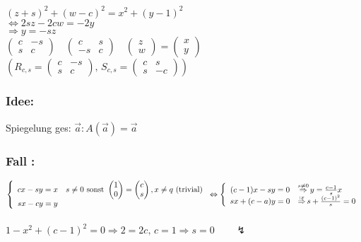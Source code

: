 $(z+s)^{2} + (w-c)^{2} = x^{2}+(y-1)^{2}$\\
$\Leftrightarrow 2sz-2cw = -2y$\\
$\Rightarrow y = -sz$\\
$\begin{pmatrix} c & -s \\ s & c \end{pmatrix} \quad \begin{pmatrix} c & s \\ -s & c \end{pmatrix} \quad \begin{pmatrix} z \\ w \end{pmatrix} = \begin{pmatrix} x \\ y \end{pmatrix}$ \\
$(R_{c,s} = \begin{pmatrix} c & -s \\ s & c \end{pmatrix}, \, S_{c,s} = \begin{pmatrix} c & s \\ s & -c \end{pmatrix})$\\
%
%
%
\subsubsection{Idee:}
Spiegelung ges: $\vec{a}: A(\vec{a})=\vec{a}$
%
%
%
\subsubsection{Fall :} 
$
\left\{
\begin{array}{c l}     
    cx-sy=x  & s \neq 0 \text{ sonst } \begin{pmatrix} 1 \\ 0 \end{pmatrix}= \begin{pmatrix} c \\ s \end{pmatrix}, x \neq q \text{ (trivial)}\\
    sx - cy = y &
\end{array}\right.
\Leftrightarrow
\left\{
\begin{array}{c l}     
 (c-1)x - sy = 0 & \mathop{\Rightarrow}\limits^{s\neq 0} y = \frac{c-1}{s}x \\
    sx + (c-a)y=0 & \mathop{\Rightarrow}\limits^{:x} s + \frac{(c-1)^{2}}{s}=0
\end{array}\right.$\\
\quad\\
$1-x^{2} + (c-1)^{2} = 0 \Rightarrow 2 = 2c, \, c=1\Rightarrow s = 0 \qquad\lightning$
%
%
%
